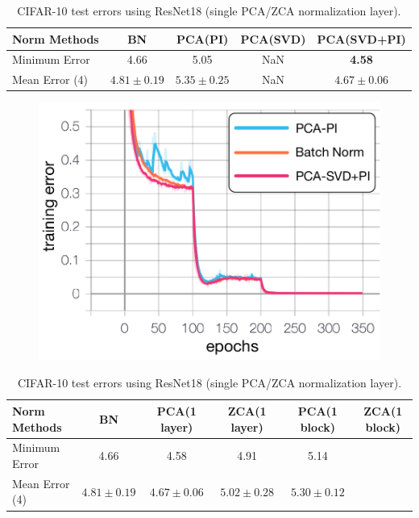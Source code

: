 \documentclass{article}
\begin{document}
\begin{table}[!htb]
\begin{centering}
\begin{tabular}{|l|c|c|c|c|}
\hline
Norm Methods          & BN        & PCA(PI)  & PCA(SVD) & PCA(SVD+PI) \\ \hline
Minimum Error         & 4.66       & 5.05   & NaN   &\textbf{4.58}\\ \hline
Mean Error (4) & $4.81{\pm}0.19$ &$5.35{\pm}0.25$ & NaN &$\mathbf{4.67{\pm}0.06}$ \\ \hline
\end{tabular}
\caption{CIFAR-10 test errors using ResNet18 (single PCA/ZCA normalization layer).}
\end{centering}
\end{table}

\begin{figure}
\includegraphics[width=0.5\linewidth]{convergence.pdf}
\end{figure}

\begin{table}[!htb]
\begin{centering}
\begin{tabular}{|l|c|c|c|c|c|}
\hline
Norm Methods          & BN        & PCA(1 layer)   & ZCA(1 layer)  & PCA(1 block)   & ZCA(1 block) \\ \hline
Minimum Error         & 4.66      &  4.58  &   4.91 &  5.14 &  \\ \hline
Mean Error (4) & $4.81{\pm}0.19$  &  $4.67{\pm}0.06$  & $5.02{\pm}0.28$ & $5.30{\pm}0.12$ &  \\ \hline
\end{tabular}
\caption{CIFAR-10 test errors using ResNet18 (single PCA/ZCA normalization layer).}
\end{centering}
\end{table}


\medskip
\small


\end{document}
